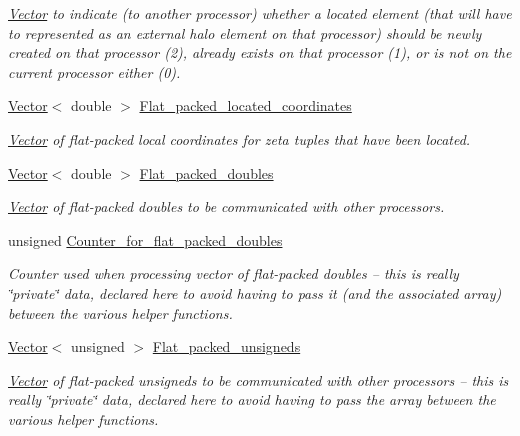 \begin{DoxyCompactItemize}
\begin{DoxyCompactList}\small\item\em \hyperlink{classoomph_1_1Vector}{Vector} to indicate (to another processor) whether a located element (that will have to represented as an external halo element on that processor) should be newly created on that processor (2), already exists on that processor (1), or is not on the current processor either (0). \end{DoxyCompactList}\item 
\hyperlink{classoomph_1_1Vector}{Vector}$<$ double $>$ \hyperlink{namespaceoomph_1_1Multi__domain__functions_a095771257db01cdebaaf92facc3057a3}{Flat\+\_\+packed\+\_\+located\+\_\+coordinates}
\begin{DoxyCompactList}\small\item\em \hyperlink{classoomph_1_1Vector}{Vector} of flat-\/packed local coordinates for zeta tuples that have been located. \end{DoxyCompactList}\item 
\hyperlink{classoomph_1_1Vector}{Vector}$<$ double $>$ \hyperlink{namespaceoomph_1_1Multi__domain__functions_a2fa0a4a4e31700e161441b19f88c4bf3}{Flat\+\_\+packed\+\_\+doubles}
\begin{DoxyCompactList}\small\item\em \hyperlink{classoomph_1_1Vector}{Vector} of flat-\/packed doubles to be communicated with other processors. \end{DoxyCompactList}\item 
unsigned \hyperlink{namespaceoomph_1_1Multi__domain__functions_aeb7431547acc61e750fcc456a25ffc13}{Counter\+\_\+for\+\_\+flat\+\_\+packed\+\_\+doubles}
\begin{DoxyCompactList}\small\item\em Counter used when processing vector of flat-\/packed doubles -- this is really \char`\"{}private\char`\"{} data, declared here to avoid having to pass it (and the associated array) between the various helper functions. \end{DoxyCompactList}\item 
\hyperlink{classoomph_1_1Vector}{Vector}$<$ unsigned $>$ \hyperlink{namespaceoomph_1_1Multi__domain__functions_a5748b2389912d36f8f05cb175105c0a3}{Flat\+\_\+packed\+\_\+unsigneds}
\begin{DoxyCompactList}\small\item\em \hyperlink{classoomph_1_1Vector}{Vector} of flat-\/packed unsigneds to be communicated with other processors -- this is really \char`\"{}private\char`\"{} data, declared here to avoid having to pass the array between the various helper functions. \end{DoxyCompactList}\item 

\end{DoxyCompactItemize}
